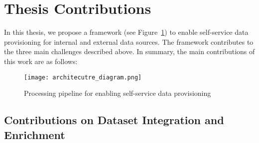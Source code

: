 \section{Thesis Contributions} \label{sec:contribution}

In this thesis, we propose a framework (see Figure~\ref{fig:architecutre_diagram}) to enable self-service data provisioning for internal and external data sources. The framework contributes to the three main challenges described above. In summary, the main contributions of this work are as follows:

\begin{figure}[!ht]
  \centering
  \texttt{[image: architecutre\_diagram.png]}
  \caption{Processing pipeline for enabling self-service data provisioning}
  \label{fig:architecutre_diagram}
\end{figure}

\subsection{Contributions on Dataset Integration and Enrichment}

